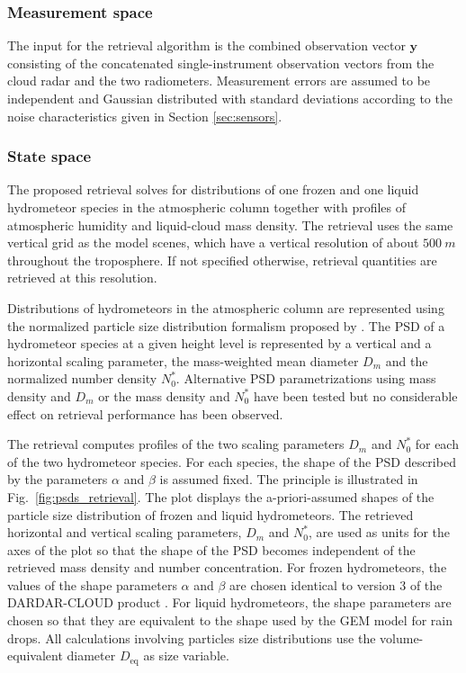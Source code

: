 \documentclass[journal abbreviation, manuscript]{copernicus}
\begin{document}
\subsubsection{Measurement space}
\label{sec:orge7dc286}

The input for the retrieval algorithm is the combined observation vector
$\mathbf{y}$ consisting of the concatenated single-instrument observation
vectors from the cloud radar and the two radiometers. Measurement errors are
assumed to be independent and Gaussian distributed with standard deviations
according to the noise characteristics given in Section \ref{sec:sensors}.

\subsubsection{State space}
\label{sec:method:fowardmodel}

The proposed retrieval solves for distributions of one frozen and one liquid
hydrometeor species in the atmospheric column together with profiles of
atmospheric humidity and liquid-cloud mass density. The retrieval uses the same
vertical grid as the model scenes, which have a vertical resolution of about
$500\ \unit{m}$ throughout the troposphere. If not specified otherwise,
retrieval quantities are retrieved at this resolution.

Distributions of hydrometeors in the atmospheric column are represented using
the normalized particle size distribution formalism proposed by
\cite{delanoe05}. The PSD of a hydrometeor species at a given height level is
represented by a vertical and a horizontal scaling parameter, the mass-weighted
mean diameter $D_m$ and the normalized number density $N_0^*$. Alternative PSD
parametrizations using mass density and $D_m$ or the mass density and $N_0^*$
have been tested but no considerable effect on retrieval performance has been
observed.

The retrieval computes profiles of the two scaling parameters $D_m$ and $N_0^*$
for each of the two hydrometeor species. For each species, the shape of the PSD
described by the parameters $\alpha$ and $\beta$ is assumed fixed. The principle
is illustrated in Fig.~\ref{fig:psds_retrieval}. The plot displays the
a-priori-assumed shapes of the particle size distribution of frozen and liquid
hydrometeors. The retrieved horizontal and vertical scaling parameters, $D_m$
and $N_0^*$, are used as units for the axes of the plot so that the shape of the
PSD becomes independent of the retrieved mass density and number concentration.
For frozen hydrometeors, the values of the shape parameters $\alpha$ and $\beta$
are chosen identical to version 3 of the DARDAR-CLOUD product
\citep{cazenave18}. For liquid hydrometeors, the shape parameters are chosen so
that they are equivalent to the shape used by the GEM model for rain drops. All
calculations involving particles size distributions use the volume-equivalent
diameter $D_\text{eq}$ as size variable.
\end{document}
